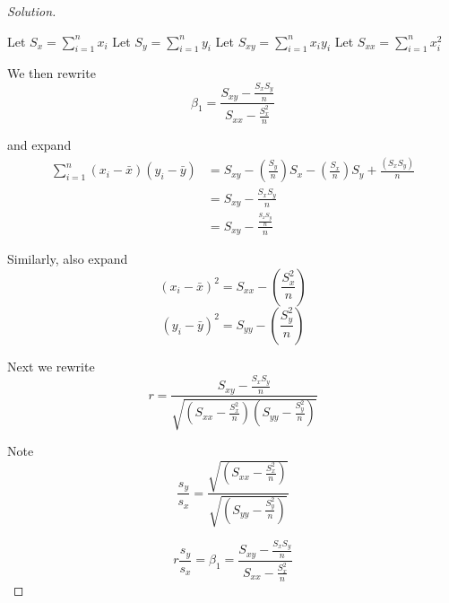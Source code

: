 \documentclass{article}
\newenvironment{solution}
  {\renewcommand\qedsymbol{$\blacksquare$}\begin{proof}[Solution]$ $}
  {\end{proof}}
\let \extra T
\begin{document}
\begin{Exercise}
\begin{solution}


        \newpage
        Let \(S_x = \sum_{i=1}^{n}  x_i\)
        Let \(S_y = \sum_{i=1}^{n}  y_i\)
        Let \(S_{xy} = \sum_{i=1}^{n}  x_iy_i\)
        Let \(S_{xx} = \sum_{i=1}^{n}  x_i^2\)

        We then rewrite
        \[\beta_1 = \frac{S_{xy}-\frac{S_xS_y}{n}}{S_{xx}- \frac{S_x^2}{n}}\]

        and expand
        \begin{align*}
            \sum_{i=1}^{n} (x_i - \bar x)(y_i - \bar y) & = S_{xy} - (\frac{S_y}{n})S_x - (\frac{S_x}{n})S_y +\frac{(S_x S_y)}{n} \\
                                                        & = S_{xy} - \frac{S_x S_y}{n}                                            \\
                                                        & = S_{xy} - \frac{\frac{S_x S_y}{n}}{n}
        \end{align*}

        Similarly, also expand
        \[(x_i - \bar x)^2 = {S_{xx} - (\frac{S_x^2}{n})}\]
        \[(y_i - \bar y)^2 = {S_{yy} - (\frac{S_y^2}{n})}\]

        Next we rewrite \[r = \frac{S_{xy} - \frac{S_x S_y}{n}}{\sqrt{(S_{xx} - \frac{S_x^2}{n})(S_{yy} - \frac{S_y^2}{n})}}\]

        Note \[\frac{s_y}{s_x} = \frac{\sqrt{(S_{xx} - \frac{S_x^2}{n})}}{\sqrt{(S_{yy} - \frac{S_y^2}{n})}}\]

        \[r\frac{s_y}{s_x} = \beta_1 = \frac{S_{xy}-\frac{S_xS_y}{n}}{S_{xx}- \frac{S_x^2}{n}}\]
    \end{solution}
\end{Exercise}

\let \extra T
\end{document}
